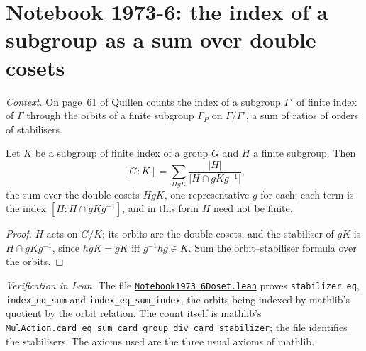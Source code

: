 \section[Notebook 1973-6: the index over double cosets]{Notebook 1973-6: the index of a subgroup as a sum over double cosets\protect{}}\label{sec:quillen-1973-6-doset}

\emph{Context.} On page~61 of  Quillen counts the index of a subgroup $\Gamma'$ of finite index of $\Gamma$ through the orbits of a finite subgroup $\Gamma_P$ on $\Gamma/\Gamma'$, a sum of ratios of orders of stabilisers.

\begin{encadre}
\begin{theoreme}\label{thm:quillen-1973-6-doset}
Let $K$ be a subgroup of finite index of a group $G$ and $H$ a finite subgroup. Then
\[ [G : K] = \sum_{HgK} \frac{\lvert H\rvert}{\lvert H \cap gKg^{-1}\rvert}, \]
the sum over the double cosets $HgK$, one representative $g$ for each; each term is the index $[H : H \cap gKg^{-1}]$, and in this form $H$ need not be finite.
\end{theoreme}
\end{encadre}

\begin{proof}
$H$ acts on $G/K$; its orbits are the double cosets, and the stabiliser of $gK$ is $H \cap gKg^{-1}$, since $hgK = gK$ iff $g^{-1}hg \in K$. Sum the orbit--stabiliser formula over the orbits.
\end{proof}

\emph{Verification in Lean.} The file \href{\leanblobmain/Notebook1973_6Doset.lean}{\texttt{Notebook1973\_6Doset.\allowbreak{}lean}} proves \texttt{stabilizer\_eq}, \texttt{index\_eq\_sum} and \texttt{index\_eq\_sum\_index}, the orbits being indexed by mathlib's quotient by the orbit relation. The count itself is mathlib's \texttt{MulAction.card\_eq\_sum\_card\_group\_div\_card\_stabilizer}; the file identifies the stabilisers. The axioms used are the three usual axioms of mathlib.

